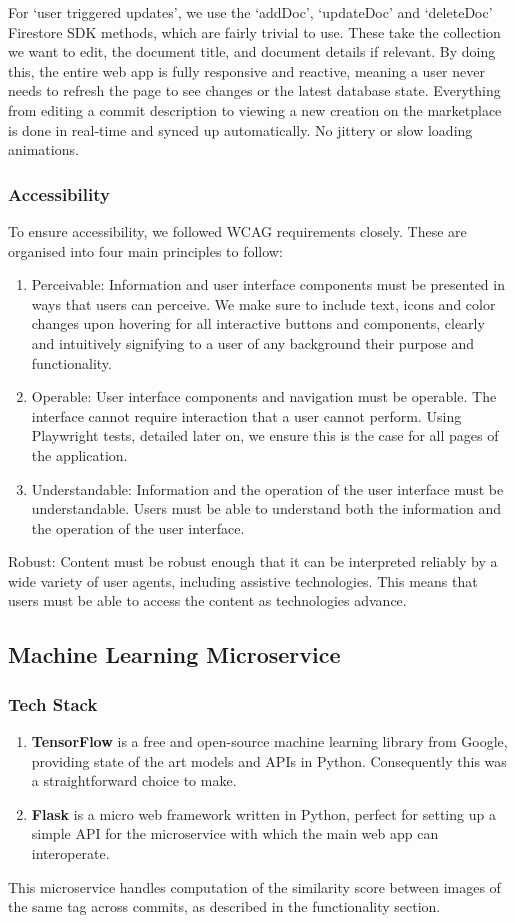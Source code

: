 \documentclass[12pt,a4paper]{article}
\begin{document}
\noindent For `user triggered updates', we use the `addDoc', `updateDoc' and `deleteDoc' Firestore SDK methods, which are fairly trivial to use. These take the collection we want to edit, the document title, and document details if relevant. 
\noindent By doing this, the entire web app is fully responsive and reactive, meaning a user never needs to refresh the page to see changes or the latest database state. Everything from editing a commit description to viewing a new creation on the marketplace is done in real-time and synced up automatically. No jittery or slow loading animations.
\subsubsection{Accessibility}
To ensure accessibility, we followed WCAG requirements closely. These are organised into four main principles to follow:
\begin{enumerate}
    \item Perceivable: Information and user interface components must be presented in ways that users can perceive. We make sure to include text, icons and color changes upon hovering for all interactive buttons and components, clearly and intuitively signifying to a user of any background their purpose and functionality.
    \item Operable: User interface components and navigation must be operable. The interface cannot require interaction that a user cannot perform. Using Playwright tests, detailed later on, we ensure this is the case for all pages of the application.
    \item Understandable: Information and the operation of the user interface must be understandable. Users must be able to understand both the information and the operation of the user interface.
\end{enumerate}



Robust: Content must be robust enough that it can be interpreted reliably by a wide variety of user agents, including assistive technologies. This means that users must be able to access the content as technologies advance.
\subsection{Machine Learning Microservice}
\subsubsection{Tech Stack}
\begin{enumerate}
    \item \textbf{TensorFlow} is a free and open-source machine learning library from Google, providing state of the art models and APIs in Python. Consequently this was a straightforward choice to make.
    \item \textbf{Flask} is a micro web framework written in Python, perfect for setting up a simple API for the microservice with which the main web app can interoperate. 
\end{enumerate}
This microservice handles computation of the similarity score between images of the same tag across commits, as described in the functionality section.
\end{document}
